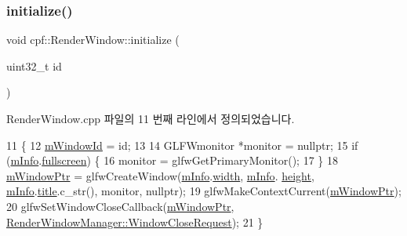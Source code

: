 \subsubsection{\texorpdfstring{initialize()}{initialize()}}
{\footnotesize\ttfamily void cpf\+::\+Render\+Window\+::initialize (\begin{DoxyParamCaption}\item[{uint32\+\_\+t}]{id }\end{DoxyParamCaption})}



Render\+Window.\+cpp 파일의 11 번째 라인에서 정의되었습니다.


\begin{DoxyCode}
11                                              \{
12         \hyperlink{classcpf_1_1_render_window_af4d30f7fd51910725a814828ea9cc33e}{mWindowId} = id;
13 
14         GLFWmonitor *monitor = \textcolor{keyword}{nullptr};
15         \textcolor{keywordflow}{if} (\hyperlink{classcpf_1_1_render_window_ad3608b5ed5c1b0c5471f96e5c5199eb0}{mInfo}.\hyperlink{structcpf_1_1_render_window_create_info_a72ea6911da5c022c63670045041b86c3}{fullscreen}) \{
16             monitor = glfwGetPrimaryMonitor();
17         \}
18         \hyperlink{classcpf_1_1_render_window_a871b4de6be0b9fa29b9394e38c395a04}{mWindowPtr} = glfwCreateWindow(\hyperlink{classcpf_1_1_render_window_ad3608b5ed5c1b0c5471f96e5c5199eb0}{mInfo}.\hyperlink{structcpf_1_1_render_window_create_info_a28983e1803a3065c8cc8beacb2b72f22}{width}, \hyperlink{classcpf_1_1_render_window_ad3608b5ed5c1b0c5471f96e5c5199eb0}{mInfo}.
      \hyperlink{structcpf_1_1_render_window_create_info_a6af4056c0776858a053126de8c2b9011}{height}, \hyperlink{classcpf_1_1_render_window_ad3608b5ed5c1b0c5471f96e5c5199eb0}{mInfo}.\hyperlink{structcpf_1_1_render_window_create_info_a47f2dbdd922a53792e16bd650064c77e}{title}.c\_str(), monitor, \textcolor{keyword}{nullptr});
19         glfwMakeContextCurrent(\hyperlink{classcpf_1_1_render_window_a871b4de6be0b9fa29b9394e38c395a04}{mWindowPtr});
20         glfwSetWindowCloseCallback(\hyperlink{classcpf_1_1_render_window_a871b4de6be0b9fa29b9394e38c395a04}{mWindowPtr}, 
      \hyperlink{classcpf_1_1_render_window_manager_a3b667bdac352e584a3dc6b8132054b36}{RenderWindowManager::WindowCloseRequest});
21     \}
\end{DoxyCode}
\mbox{\label{classcpf_1_1_render_window_aebc9f2d43f5802a2affb26a2179312c9}} 

